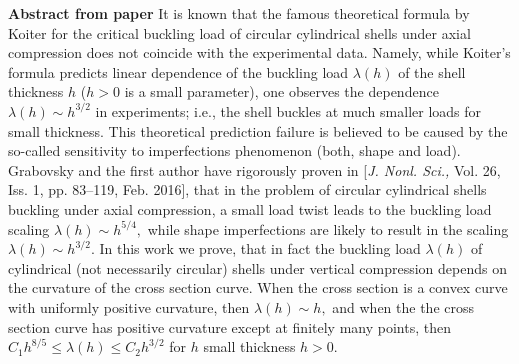 \textbf{Abstract from paper}
It is known that the famous theoretical formula by Koiter for the critical buckling load of circular cylindrical shells under axial compression does not 
coincide with the experimental data. Namely, while Koiter's formula predicts linear dependence of the buckling load $\lambda(h)$ of the shell thickness 
$h$ ($h>0$ is a small parameter), one observes the dependence $\lambda(h)\sim h^{3/2}$ in experiments; i.e., the shell buckles at much smaller loads for small thickness. This theoretical prediction failure is believed to be caused by the so-called sensitivity to imperfections phenomenon (both, shape and load). Grabovsky and the first author have rigorously proven in [\textit{J. Nonl. Sci.,}  Vol. 26, Iss. 1, pp. 83--119, Feb. 2016], that in the problem of circular cylindrical shells buckling under axial compression, a small load twist leads to the buckling load scaling $\lambda(h)\sim h^{5/4},$ while shape imperfections are likely to result in the scaling $\lambda(h)\sim h^{3/2}.$ In this work we prove, that in fact the buckling load $\lambda(h)$ of cylindrical (not necessarily circular) shells under vertical compression depends on the curvature of the cross section curve. When the cross section is a convex curve with uniformly positive curvature, 
then $\lambda(h)\sim h,$ and when the the cross section curve has positive curvature except at finitely many points, 
then $C_1h^{8/5}\leq \lambda(h)\leq C_2h^{3/2}$ for $h$ small thickness $h>0.$ 
